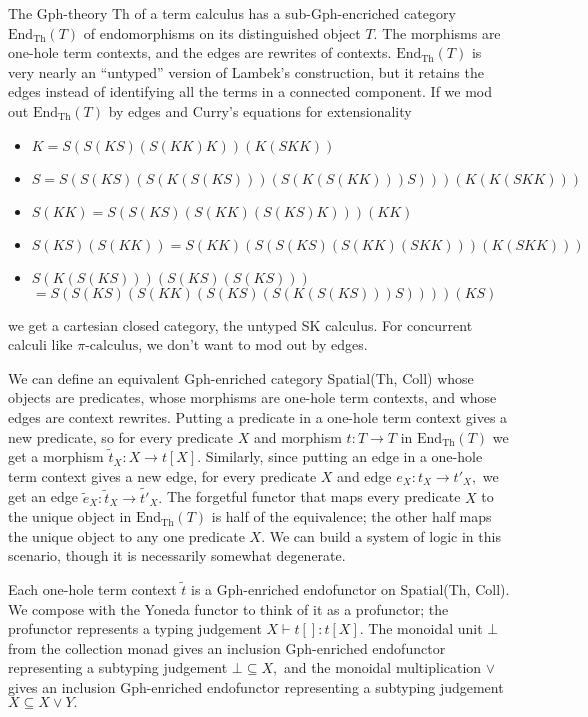 \documentclass[submission,copyright,creativecommons]{eptcs}
\newcommand{\maps}{\colon}
\newcommand{\End}{\mathrm{End}}
\newcommand{\Th}{\mathrm{Th}}
\newcommand{\pic}{$\pi\mbox{-calculus}$\xspace}
\newcommand{\entails}{\vdash}
\begin{document}
The Gph-theory Th of a term calculus has a sub-Gph-encriched category $\End_\Th(T)$ of endomorphisms on its distinguished object $T.$  The morphisms are one-hole term contexts, and the edges are rewrites of contexts.  $\End_\Th(T)$ is very nearly an ``untyped'' version of Lambek's construction, but it retains the edges instead of identifying all the terms in a connected component.  If we mod out $\End_\Th(T)$ by edges and Curry's equations for extensionality 
\begin{itemize}
  \item $K = S(S(KS)(S(KK)K))(K(SKK))$
  \item $S = S(S(KS)(S(K(S(KS)))(S(K(S(KK)))S)))(K(K(SKK)))$
  \item $S(KK) = S(S(KS)(S(KK)(S(KS)K)))(KK)$
  \item $S(KS)(S(KK)) = S(KK)(S(S(KS)(S(KK)(SKK)))(K(SKK)))$
  \item $S(K(S(KS)))(S(KS)(S(KS)))$ \\ $= S(S(KS)(S(KK)(S(KS)(S(K(S(KS)))S))))(KS)$
\end{itemize}
we get a cartesian closed category, the untyped SK calculus.  For concurrent calculi like \pic, we don't want to mod out by edges.

We can define an equivalent Gph-enriched category Spatial(Th, Coll) whose objects are predicates, whose morphisms are one-hole term contexts, and whose edges are context rewrites.  Putting a predicate in a one-hole term context gives a new predicate, so for every predicate $X$ and morphism $t\maps T \to T$ in $\End_\Th(T)$ we get a morphism $\tilde{t}_X\maps X \to t[X].$  Similarly, since putting an edge in a one-hole term context gives a new edge, for every predicate $X$ and edge $e_X\maps t_X \to t'_X,$ we get an edge $\tilde{e}_X\maps \tilde{t}_X \to \tilde{t'}_X.$  The forgetful functor that maps every predicate $X$ to the unique object in $\End_\Th(T)$ is half of the equivalence; the other half maps the unique object to any one predicate $X.$  We can build a system of logic in this scenario, though it is necessarily somewhat degenerate.  

Each one-hole term context $\tilde{t}$ is a Gph-enriched endofunctor on Spatial(Th, Coll).  We compose with the Yoneda functor to think of it as a profunctor; the profunctor represents a typing judgement $X \entails t[]\maps t[X].$  The monoidal unit $\bot$ from the collection monad gives an inclusion Gph-enriched endofunctor representing a subtyping judgement $\bot \subseteq X,$ and the monoidal multiplication $\lor$ gives an inclusion Gph-enriched endofunctor representing a subtyping judgement $X \subseteq X \lor Y.$
\end{document}
